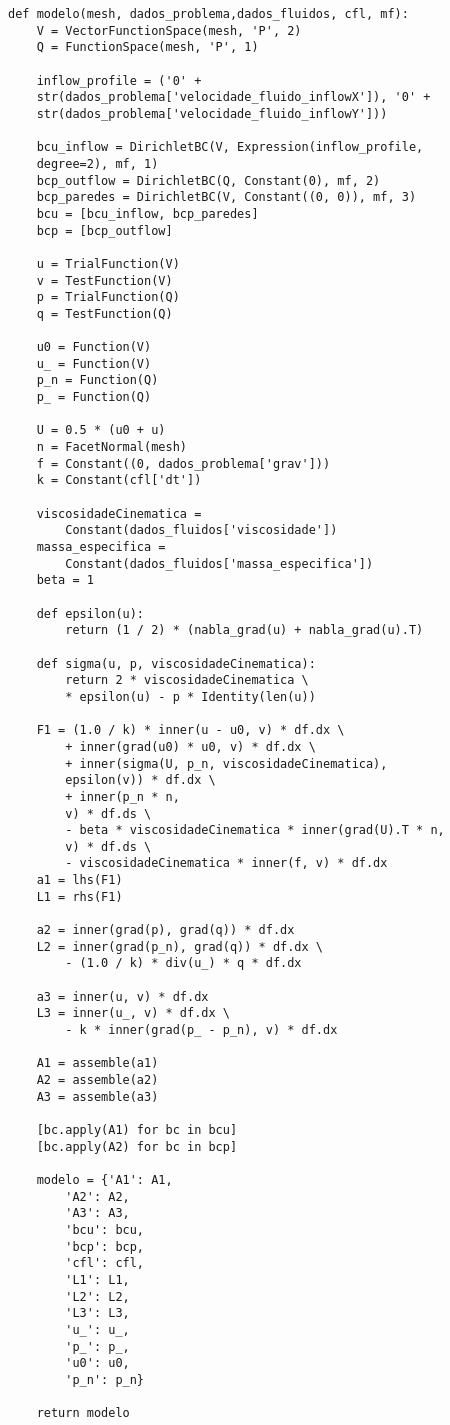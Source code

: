 \begin{lstlisting}[title=\phantom{}]
def modelo(mesh, dados_problema,dados_fluidos, cfl, mf):
    V = VectorFunctionSpace(mesh, 'P', 2) 
    Q = FunctionSpace(mesh, 'P', 1)  
    
    inflow_profile = ('0' + 
    str(dados_problema['velocidade_fluido_inflowX']), '0' + 
    str(dados_problema['velocidade_fluido_inflowY']))
    
    bcu_inflow = DirichletBC(V, Expression(inflow_profile, 
    degree=2), mf, 1)
    bcp_outflow = DirichletBC(Q, Constant(0), mf, 2)
    bcp_paredes = DirichletBC(V, Constant((0, 0)), mf, 3)
    bcu = [bcu_inflow, bcp_paredes]  
    bcp = [bcp_outflow]  
    
    u = TrialFunction(V)
    v = TestFunction(V)
    p = TrialFunction(Q)
    q = TestFunction(Q)
    
    u0 = Function(V)
    u_ = Function(V)
    p_n = Function(Q)
    p_ = Function(Q)
    
    U = 0.5 * (u0 + u)
    n = FacetNormal(mesh)
    f = Constant((0, dados_problema['grav']))
    k = Constant(cfl['dt'])
    
    viscosidadeCinematica =
        Constant(dados_fluidos['viscosidade'])
    massa_especifica =
        Constant(dados_fluidos['massa_especifica'])
    beta = 1
    
    def epsilon(u):
        return (1 / 2) * (nabla_grad(u) + nabla_grad(u).T)
    
    def sigma(u, p, viscosidadeCinematica):
        return 2 * viscosidadeCinematica \
        * epsilon(u) - p * Identity(len(u))
    
    F1 = (1.0 / k) * inner(u - u0, v) * df.dx \
        + inner(grad(u0) * u0, v) * df.dx \
        + inner(sigma(U, p_n, viscosidadeCinematica), 
        epsilon(v)) * df.dx \
        + inner(p_n * n, 
        v) * df.ds \
        - beta * viscosidadeCinematica * inner(grad(U).T * n, 
        v) * df.ds \
        - viscosidadeCinematica * inner(f, v) * df.dx
    a1 = lhs(F1)
    L1 = rhs(F1)
    
    a2 = inner(grad(p), grad(q)) * df.dx
    L2 = inner(grad(p_n), grad(q)) * df.dx \
        - (1.0 / k) * div(u_) * q * df.dx
    
    a3 = inner(u, v) * df.dx
    L3 = inner(u_, v) * df.dx \
        - k * inner(grad(p_ - p_n), v) * df.dx
    
    A1 = assemble(a1)
    A2 = assemble(a2)
    A3 = assemble(a3)
    
    [bc.apply(A1) for bc in bcu]
    [bc.apply(A2) for bc in bcp]
    
    modelo = {'A1': A1,
    	'A2': A2,
    	'A3': A3,
    	'bcu': bcu,
    	'bcp': bcp,
    	'cfl': cfl,
    	'L1': L1,
    	'L2': L2,
    	'L3': L3,
    	'u_': u_,
    	'p_': p_,
    	'u0': u0,
    	'p_n': p_n}
    
    return modelo
\end{lstlisting}

